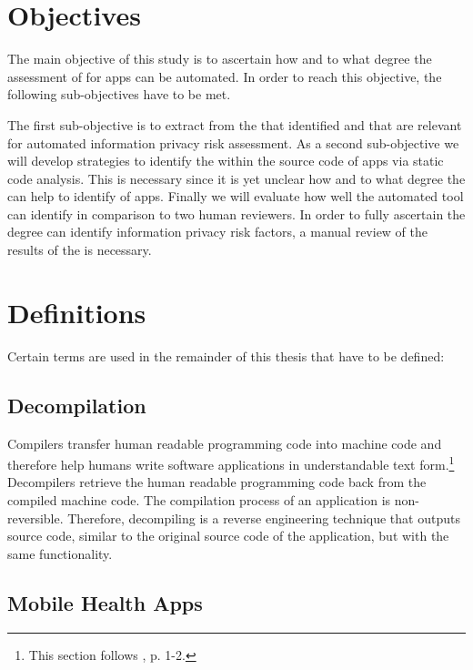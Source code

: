 \documentclass[
	a4paper,
	oneside,
	12pt,
	liststotocnumbered
]{article}
\let\cite\textcite
\begin{document}
\section{Objectives}

The main objective of this study is to ascertain how and to what degree the assessment of \iprfs for \mH apps can be automated.
In order to reach this objective, the following sub-objectives have to be met.

The first sub-objective is to extract \iprfs from the \ipp that \cite{Dehling2016} identified and that are relevant for automated information privacy risk assessment.
As a second sub-objective we will develop strategies to identify the \iprfs within the source code of \mH apps via static code analysis.
This is necessary since it is yet unclear how and to what degree the \sca can help to identify \iprfs of \mH apps. 
Finally we will evaluate how well the automated \pra tool can identify \iprfs in comparison to two human reviewers.
In order to fully ascertain the degree \sca can identify information privacy risk factors, a manual review of the results of the \sca is necessary.

\section{Definitions}
Certain terms are used in the remainder of this thesis that have to be defined:

\subsection{Decompilation}

Compilers transfer human readable programming code into machine code and therefore help humans write software applications in understandable text form.\footnote{This section follows \cite{nolan2012decompiling}, p. 1-2.}
Decompilers retrieve the human readable programming code back from the compiled machine code. 
The compilation process of an application is non-reversible. Therefore, decompiling is a reverse engineering technique that outputs source code, similar to the original source code of the application, but with the same functionality.  

\subsection{Mobile Health Apps}
\end{document}
